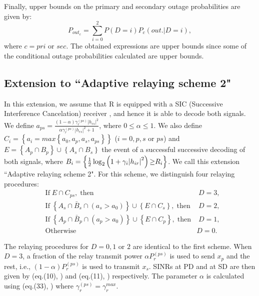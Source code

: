 \documentclass[conference,twocolumn]{IEEEtran}
\begin{document}
Finally, upper bounds on the primary and secondary outage probabilities are given by:
\begin{equation}
\label{eq:outage_adaptive}
P_{out_{c}}= \sum_{i=0}^{2}{P(D=i)P_c(out.|D=i)},
\end{equation}
where $c=pri$ or $sec$. The obtained expressions are upper bounds since some of the conditional outage probabilities calculated are upper bounds.

\subsection{Extension to ``Adaptive relaying scheme 2"}
In this extension, we assume that R is equipped with a SIC (Successive Interference Cancelation) receiver \cite{Tse}, and hence it is able to decode both signals.
We define $a_{ps}=\frac{(1-\alpha)\gamma_r^{(ps)} |h_{rs}|^2}{\alpha\gamma_r^{(ps)} |h_{rs}|^2+1}$, where $0 \leq \alpha \leq 1$.
We also define $C_{i}=\left\{a_i=max\left\{ a_0, a_p, a_s, a_{ps} \right\} \right\}$ ($i=0,p,s$ or $ps$) and $E=\left\{A_p \cap B_p \right\} \cup \left\{ A_s \cap B_s \right\}$ the event of a successful successive decoding of both signals, where $B_i = \left\{\frac{1}{2} \log_2\left( {1 + {\gamma _{i}}{{\left| {{h_{ir}}} \right|}^2}} \right){\rm{ \geq }}{R_i}\right\}$. We call this extension ``Adaptive relaying scheme 2". For this scheme, we distinguish four relaying procedures:
\begin{eqnarray}
\label{eq:condition_CR_helps_PU_SU}
\nonumber &\mathrm{If}\; E  \cap C_{ps},\;\mathrm{then}&\;D = 3,\\
\nonumber &\mathrm{If}\;\left\{A_s \cap \bar{B}_s \cap (a_s >a_0) \right\} \cup \left\{E \cap C_s \right\},\;\mathrm{then}&\;D = 2,\\
\nonumber &\mathrm{If}\;\left\{A_p \cap \bar{B}_p \cap (a_p >a_0)  \right\} \cup \left\{E \cap C_p \right\},\;\mathrm{then}&\;D = 1,\\
\nonumber &\mathrm{Otherwise}\;&D = 0.
\end{eqnarray}

The relaying procedures for $D=0,1$ or $2$ are identical to the first scheme. When $D=3$, a fraction of the relay transmit power $\alpha P_r^{(ps)}$ is used to send $x_p$ and the rest, i.e., $(1-\alpha) P_r^{(ps)}$ is used to transmit $x_s$. SINRs at PD and at SD are then given by (eq.(10), \cite{Jaafar_Globecom}) and (eq.(11), \cite{Jaafar_Globecom}) respectively. The parameter $\alpha$ is calculated using (eq.(33), \cite{Jaafar_Globecom}) where $\gamma_r^{(ps)}=\gamma_r^{max}$.
\end{document}
